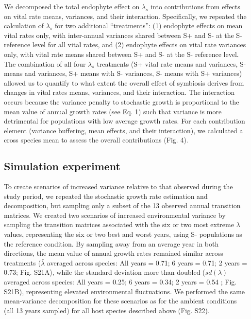 \documentclass[9pt,twocolumn,twoside]{pnas-new}
\begin{document}
{We decomposed the total endophyte effect on $\lambda_s$ into contributions from effects on vital rate means, variances, and their interaction. 
Specifically, we repeated the calculation of $\lambda_s$ for two additional ``treatments'': (1) endophyte effects on mean vital rates only, with inter-annual variances shared between S+ and S- at the S- reference level for all vital rates, and (2) endophyte effects on vital rate variances only, with vital rate means shared between S+ and S- at the S- reference level. 
The combination of all four $\lambda_s$ treatments (S+ vital rate means and variances, S- means and variances, S+ means with S- variances, S- means with S+ variances) allowed us to quantify to what extent the overall effect of symbiosis derives from changes in vital rates means, variances, and their interaction. 
The interaction occurs because the variance penalty to stochastic growth is proportional to the mean value of annual growth rates (see Eq. 1) such that variance is more detrimental for populations with low average growth rates. 
For each contribution element (variance buffering, mean effects, and their interaction), we calculated a cross species mean to assess the overall contributions (Fig. 4).

\subsection*{Simulation experiment}
To create scenarios of increased variance relative to that observed during the study period, we repeated the stochastic growth rate estimation and decomposition, but sampling only a subset of the 13 observed annual transition matrices. 
We created two scenarios of increased environmental variance by sampling the transition matrices associated with the six or two most extreme $\lambda$ values, representing the six or two best and worst years, using S- populations as the reference condition. 
By sampling away from an average year in both directions, the mean value of annual growth rates remained similar across treatments ($\bar{\lambda}$ averaged across species: All years = 0.71; 6 years = 0.71; 2 years = 0.73; Fig. S21A), while the standard deviation more than doubled ($sd(\lambda)$ averaged across species: All years = 0.25; 6 years = 0.34; 2 years = 0.54 ; Fig. S21B), representing elevated environmental fluctuations.
We performed the same mean-variance decomposition for these scenarios as for the ambient conditions (all 13 years sampled) for all host species described above (Fig. S22). 

}
\showmatmethods{} %
\end{document}
